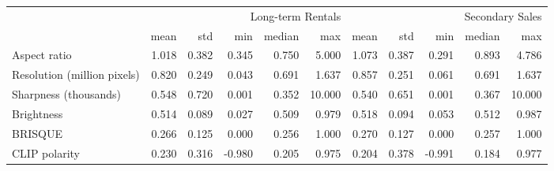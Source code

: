 \begin{tabular}{lrrrrrrrrrr}
\toprule
 & \multicolumn{5}{r}{Long-term Rentals} & \multicolumn{5}{r}{Secondary Sales} \\
 & mean & std & min & median & max & mean & std & min & median & max \\
\midrule
Aspect ratio & 1.018 & 0.382 & 0.345 & 0.750 & 5.000 & 1.073 & 0.387 & 0.291 & 0.893 & 4.786 \\
Resolution (million pixels) & 0.820 & 0.249 & 0.043 & 0.691 & 1.637 & 0.857 & 0.251 & 0.061 & 0.691 & 1.637 \\
Sharpness (thousands) & 0.548 & 0.720 & 0.001 & 0.352 & 10.000 & 0.540 & 0.651 & 0.001 & 0.367 & 10.000 \\
Brightness & 0.514 & 0.089 & 0.027 & 0.509 & 0.979 & 0.518 & 0.094 & 0.053 & 0.512 & 0.987 \\
BRISQUE & 0.266 & 0.125 & 0.000 & 0.256 & 1.000 & 0.270 & 0.127 & 0.000 & 0.257 & 1.000 \\
CLIP polarity & 0.230 & 0.316 & -0.980 & 0.205 & 0.975 & 0.204 & 0.378 & -0.991 & 0.184 & 0.977 \\
\bottomrule
\end{tabular}
